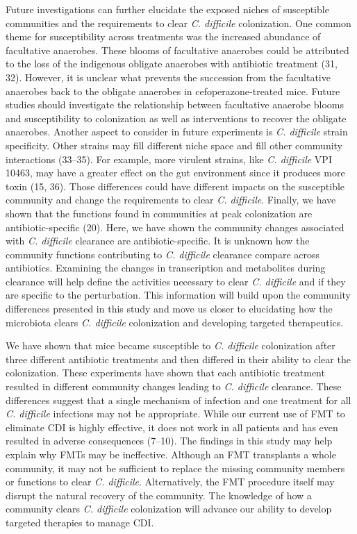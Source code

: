 \documentclass[11pt,]{article}
\begin{document}
Future investigations can further elucidate the exposed niches of
susceptible communities and the requirements to clear \emph{C.
difficile} colonization. One common theme for susceptibility across
treatments was the increased abundance of facultative anaerobes. These
blooms of facultative anaerobes could be attributed to the loss of the
indigenous obligate anaerobes with antibiotic treatment (31, 32).
However, it is unclear what prevents the succession from the facultative
anaerobes back to the obligate anaerobes in cefoperazone-treated mice.
Future studies should investigate the relationship between facultative
anaerobe blooms and susceptibility to colonization as well as
interventions to recover the obligate anaerobes. Another aspect to
consider in future experiments is \emph{C. difficile} strain
specificity. Other strains may fill different niche space and fill other
community interactions (33--35). For example, more virulent strains,
like \emph{C. difficile} VPI 10463, may have a greater effect on the gut
environment since it produces more toxin (15, 36). Those differences
could have different impacts on the susceptible community and change the
requirements to clear \emph{C. difficile}. Finally, we have shown that
the functions found in communities at peak colonization are
antibiotic-specific (20). Here, we have shown the community changes
associated with \emph{C. difficile} clearance are antibiotic-specific.
It is unknown how the community functions contributing to \emph{C.
difficile} clearance compare across antibiotics. Examining the changes
in transcription and metabolites during clearance will help define the
activities necessary to clear \emph{C. difficile} and if they are
specific to the perturbation. This information will build upon the
community differences presented in this study and move us closer to
elucidating how the microbiota clears \emph{C. difficile} colonization
and developing targeted therapeutics.

We have shown that mice became susceptible to \emph{C. difficile}
colonization after three different antibiotic treatments and then
differed in their ability to clear the colonization. These experiments
have shown that each antibiotic treatment resulted in different
community changes leading to \emph{C. difficile} clearance. These
differences suggest that a single mechanism of infection and one
treatment for all \emph{C. difficile} infections may not be appropriate.
While our current use of FMT to eliminate CDI is highly effective, it
does not work in all patients and has even resulted in adverse
consequences (7--10). The findings in this study may help explain why
FMTs may be ineffective. Although an FMT transplants a whole community,
it may not be sufficient to replace the missing community members or
functions to clear \emph{C. difficile}. Alternatively, the FMT procedure
itself may disrupt the natural recovery of the community. The knowledge
of how a community clears \emph{C. difficile} colonization will advance
our ability to develop targeted therapies to manage CDI.
\end{document}
